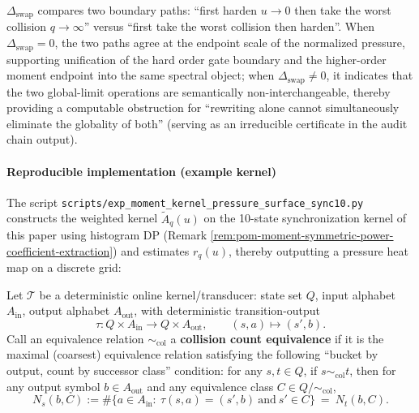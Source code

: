 \begin{remark}\label{rem:pom-hard-tail-swap-anomaly}
\(\Delta_{\mathrm{swap}}\) compares two boundary paths: ``first harden \(u\to 0\) then take the worst collision \(q\to\infty\)'' versus ``first take the worst collision then harden''.
When \(\Delta_{\mathrm{swap}}=0\), the two paths agree at the endpoint scale of the normalized pressure, supporting unification of the hard order gate boundary and the higher-order moment endpoint into the same spectral object;
when \(\Delta_{\mathrm{swap}}\neq 0\), it indicates that the two global-limit operations are semantically non-interchangeable, thereby providing a computable obstruction for ``rewriting alone cannot simultaneously eliminate the globality of both'' (serving as an irreducible certificate in the audit chain output).
\end{remark}

\paragraph{Reproducible implementation (example kernel)}
The script \texttt{scripts/exp\_moment\_kernel\_pressure\_surface\_sync10.py} constructs the weighted kernel \(\widetilde A_q(u)\) on the 10-state synchronization kernel of this paper using histogram DP (Remark \ref{rem:pom-moment-symmetric-power-coefficient-extraction}) and estimates \(r_q(u)\), thereby outputting a pressure heat map on a discrete grid:


\begin{definition}\label{def:pom-collision-count-bisim}
Let \(\mathcal{T}\) be a deterministic online kernel/transducer: state set \(Q\), input alphabet \(A_{\mathrm{in}}\), output alphabet \(A_{\mathrm{out}}\), with deterministic transition-output
\[
\tau:Q\times A_{\mathrm{in}}\to Q\times A_{\mathrm{out}},\qquad (s,a)\mapsto (s',b).
\]
Call an equivalence relation \(\sim_{\mathrm{col}}\) a \textbf{collision count equivalence} if it is the maximal (coarsest) equivalence relation satisfying the following ``bucket by output, count by successor class'' condition:
for any \(s,t\in Q\), if \(s\sim_{\mathrm{col}} t\), then for any output symbol \(b\in A_{\mathrm{out}}\) and any equivalence class \(C\in Q/{\sim_{\mathrm{col}}}\),
\[
N_{s}(b,C):=\#\{a\in A_{\mathrm{in}}:\ \tau(s,a)=(s',b)\ \text{and}\ s'\in C\}
\ =\
N_{t}(b,C).
\]
\end{definition}

